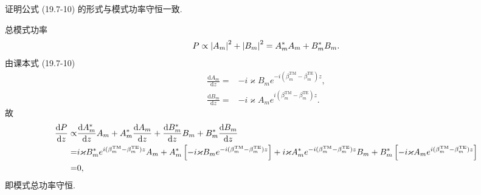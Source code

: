 \documentclass{note}
\begin{document}
\begin{exe}
    证明公式 (19.7-10) 的形式与模式功率守恒一致.
\end{exe}
\begin{pf}
    总模式功率
    \begin{align}
        P\propto\left\lvert A_m\right\rvert^2+\left\lvert B_m\right\rvert^2=A_m^*A_m+B_m^*B_m.
    \end{align}
    由课本式 (19.7-10)
    \begin{align}
        \frac{\mathrm{d}A_m}{\mathrm{d}z}=&-i\varkappa B_me^{-i(\beta_m^{\text{TM}}-\beta_m^{\text{TE}})z},\\
        \frac{\mathrm{d}B_m}{\mathrm{d}z}=&-i\varkappa A_me^{i(\beta_m^{\text{TM}}-\beta_m^{\text{TE}})z}.
    \end{align}
    故
    \begin{align}
        \notag\frac{\mathrm{d}P}{\mathrm{d}z}\propto&\frac{\mathrm{d}A_m^*}{\mathrm{d}z}A_m+A_m^*\frac{\mathrm{d}A_m}{\mathrm{d}z}+\frac{\mathrm{d}B_m^*}{\mathrm{d}z}B_m+B_m^*\frac{\mathrm{d}B_m}{\mathrm{d}z}\\
        \notag=&i\varkappa B_m^*e^{i(\beta_m^{\text{TM}}-\beta_m^{\text{TE}})z}A_m+A_m^*\left[-i\varkappa B_me^{-i(\beta_m^{\text{TM}}-\beta_m^{\text{TE}})z}\right]+i\varkappa A_m^*e^{-i(\beta_m^{\text{TM}}-\beta_m^{\text{TE}})z}B_m+B_m^*\left[-i\varkappa A_me^{i(\beta_m^{\text{TM}}-\beta_m^{\text{TE}})z}\right]\\
        =&0,
    \end{align}
    即模式总功率守恒.
\end{pf}
\end{document}
